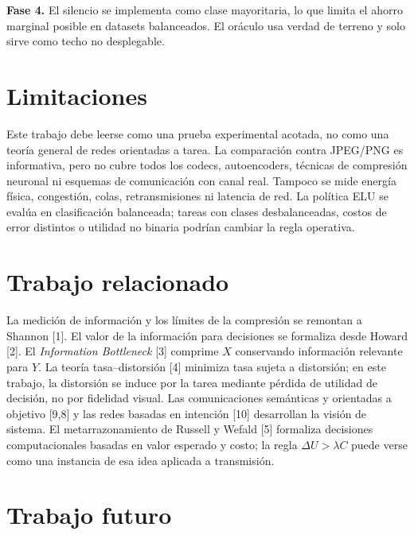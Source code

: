 \textbf{Fase 4.} El silencio se implementa como clase mayoritaria, lo que limita el ahorro marginal posible en datasets balanceados. El or\'aculo usa verdad de terreno y solo sirve como techo no desplegable.

\section{Limitaciones}

Este trabajo debe leerse como una prueba experimental acotada, no como una teor\'ia general de redes orientadas a tarea. La comparaci\'on contra JPEG/PNG es informativa, pero no cubre todos los codecs, autoencoders, t\'ecnicas de compresi\'on neuronal ni esquemas de comunicaci\'on con canal real. Tampoco se mide energ\'ia f\'isica, congesti\'on, colas, retransmisiones ni latencia de red. La pol\'itica ELU se eval\'ua en clasificaci\'on balanceada; tareas con clases desbalanceadas, costos de error distintos o utilidad no binaria podr\'ian cambiar la regla operativa.

\section{Trabajo relacionado}

La medici\'on de informaci\'on y los l\'imites de la compresi\'on se remontan a Shannon [1]. El valor de la informaci\'on para decisiones se formaliza desde Howard [2]. El \emph{Information Bottleneck} [3] comprime $X$ conservando informaci\'on relevante para $Y$. La teor\'ia tasa--distorsi\'on [4] minimiza tasa sujeta a distorsi\'on; en este trabajo, la distorsi\'on se induce por la tarea mediante p\'erdida de utilidad de decisi\'on, no por fidelidad visual. Las comunicaciones sem\'anticas y orientadas a objetivo [9,8] y las redes basadas en intenci\'on [10] desarrollan la visi\'on de sistema. El metarrazonamiento de Russell y Wefald [5] formaliza decisiones computacionales basadas en valor esperado y costo; la regla $\Delta U>\lambda C$ puede verse como una instancia de esa idea aplicada a transmisi\'on.

\section{Trabajo futuro}

